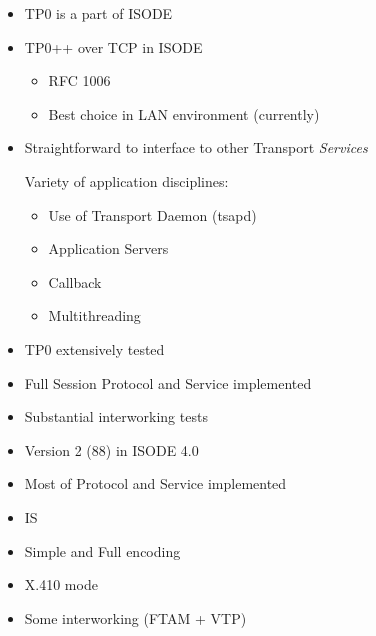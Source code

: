 \begin {bwslide}
\begin {itemize}
\item TP0 is a part of ISODE
\item TP0++ over TCP in ISODE
\begin {itemize}
\item RFC 1006
\item Best choice in LAN environment (currently)
\end {itemize}

\item Straightforward to interface to other Transport {\em Services}

Variety of application disciplines:
\begin {itemize}
\item Use of Transport Daemon (tsapd) 
\item Application Servers
\item Callback
\item Multithreading
\end {itemize}

\item TP0 extensively tested
\end {itemize}
\end {bwslide}

\begin {bwslide}

\begin {itemize}
\item Full Session Protocol and Service implemented
\item Substantial interworking tests
\item Version 2 (88) in ISODE 4.0 
\end {itemize}

\end {bwslide}


\begin {bwslide}
\begin {itemize}
\item Most of Protocol and Service implemented
\item IS
\item Simple and Full encoding
\item X.410 mode
\item Some interworking (FTAM + VTP)
\end {itemize}

\end {bwslide}



